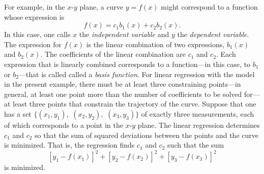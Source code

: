 \documentclass[twocolumn]{article}
\begin{document}
For example, in the $x$-$y$ plane, a curve $y = f(x)$ might correspond to a
function whose expression is
\begin{equation}
   f(x) = c_1 b_1(x) + c_2 b_2(x).
\end{equation}
In this case, one calls $x$ the \emph{independent variable} and $y$ the
\emph{dependent variable}.  The expression for $f(x)$ is the linear combination
of two expressions, $b_1(x)$ and $b_2(x)$.  The coefficients of the linear
combination are $c_1$ and $c_2$.  Each expression that is linearly combined
corresponds to a function---in this case, to $b_1$ or $b_2$---that is called
called a \emph{basis function}.  For linear regression with the model in the
present example, there must be at least three constraining points---in general,
at least one point more than the number of coefficients to be solved for---at
least three points that constrain the trajectory of the curve.  Suppose that
one has a set $\{(x_1, y_1),$ $(x_2, y_2),$ $(x_3, y_3)\}$ of exactly three
measurements, each of which corresponds to a point in the $x$-$y$ plane.  The
linear regression determines $c_1$ and $c_2$ so that the sum of squared
deviations between the points and the curve is minimized.  That is, the
regression finds $c_1$ and $c_2$ such that the sum
\begin{equation}
   \left[y_1 - f(x_1)\right]^2 + \left[y_2 - f(x_2)\right]^2 + \left[y_3 -
   f(x_3)\right]^2
\end{equation}
is minimized.
\end{document}
